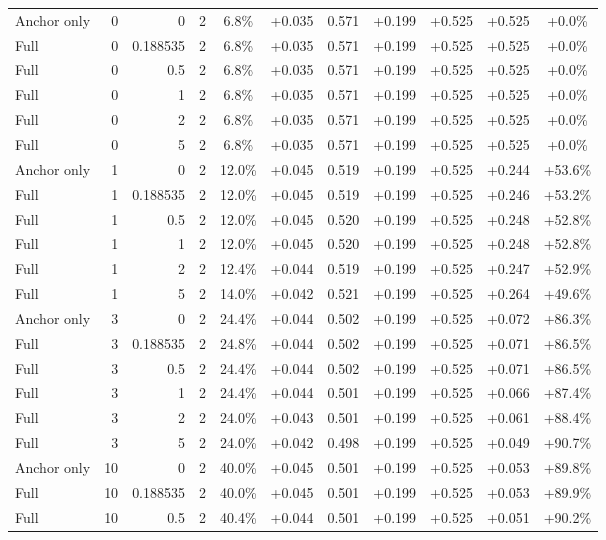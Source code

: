 \begin{table}[htbp]
\begin{tabular}{lrrrccccccc}
Anchor only & 0 & 0 & 2 & 6.8\% & +0.035 & 0.571 & +0.199 & +0.525 & +0.525 & +0.0\% \\
Full & 0 & 0.188535 & 2 & 6.8\% & +0.035 & 0.571 & +0.199 & +0.525 & +0.525 & +0.0\% \\
Full & 0 & 0.5 & 2 & 6.8\% & +0.035 & 0.571 & +0.199 & +0.525 & +0.525 & +0.0\% \\
Full & 0 & 1 & 2 & 6.8\% & +0.035 & 0.571 & +0.199 & +0.525 & +0.525 & +0.0\% \\
Full & 0 & 2 & 2 & 6.8\% & +0.035 & 0.571 & +0.199 & +0.525 & +0.525 & +0.0\% \\
Full & 0 & 5 & 2 & 6.8\% & +0.035 & 0.571 & +0.199 & +0.525 & +0.525 & +0.0\% \\
Anchor only & 1 & 0 & 2 & 12.0\% & +0.045 & 0.519 & +0.199 & +0.525 & +0.244 & +53.6\% \\
Full & 1 & 0.188535 & 2 & 12.0\% & +0.045 & 0.519 & +0.199 & +0.525 & +0.246 & +53.2\% \\
Full & 1 & 0.5 & 2 & 12.0\% & +0.045 & 0.520 & +0.199 & +0.525 & +0.248 & +52.8\% \\
Full & 1 & 1 & 2 & 12.0\% & +0.045 & 0.520 & +0.199 & +0.525 & +0.248 & +52.8\% \\
Full & 1 & 2 & 2 & 12.4\% & +0.044 & 0.519 & +0.199 & +0.525 & +0.247 & +52.9\% \\
Full & 1 & 5 & 2 & 14.0\% & +0.042 & 0.521 & +0.199 & +0.525 & +0.264 & +49.6\% \\
Anchor only & 3 & 0 & 2 & 24.4\% & +0.044 & 0.502 & +0.199 & +0.525 & +0.072 & +86.3\% \\
Full & 3 & 0.188535 & 2 & 24.8\% & +0.044 & 0.502 & +0.199 & +0.525 & +0.071 & +86.5\% \\
Full & 3 & 0.5 & 2 & 24.4\% & +0.044 & 0.502 & +0.199 & +0.525 & +0.071 & +86.5\% \\
Full & 3 & 1 & 2 & 24.4\% & +0.044 & 0.501 & +0.199 & +0.525 & +0.066 & +87.4\% \\
Full & 3 & 2 & 2 & 24.0\% & +0.043 & 0.501 & +0.199 & +0.525 & +0.061 & +88.4\% \\
Full & 3 & 5 & 2 & 24.0\% & +0.042 & 0.498 & +0.199 & +0.525 & +0.049 & +90.7\% \\
Anchor only & 10 & 0 & 2 & 40.0\% & +0.045 & 0.501 & +0.199 & +0.525 & +0.053 & +89.8\% \\
Full & 10 & 0.188535 & 2 & 40.0\% & +0.045 & 0.501 & +0.199 & +0.525 & +0.053 & +89.9\% \\
Full & 10 & 0.5 & 2 & 40.4\% & +0.044 & 0.501 & +0.199 & +0.525 & +0.051 & +90.2\% \\

\end{tabular}
\end{table}
